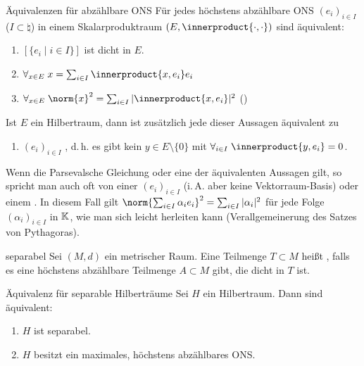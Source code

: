 \begin{Satz}{Äquivalenzen für abzählbare ONS}
    Für jedes höchstens abzählbare ONS $(e_i)_{i \in I}$ ($I \subset \natural$)
    in einem Skalarproduktraum $(E, \innerproduct{\cdot, \cdot})$ sind äquivalent:
    \begin{enumerate}
        \item
        $[\{e_i \;|\; i \in I\}]$ ist dicht in $E$.

        \item
        $\forall_{x \in E}\; x = \sum_{i \in I} \innerproduct{x, e_i} e_i$

        \item
        $\forall_{x \in E}\; \norm{x}^2 = \sum_{i \in I} |\innerproduct{x, e_i}|^2$
        ()
    \end{enumerate}
    Ist $E$ ein Hilbertraum, dann ist zusätzlich jede dieser Aussagen äquivalent zu
    \begin{enumerate}[start=4]
        \item
        $(e_i)_{i \in I}$ , d.\,h. es gibt kein $y \in E \setminus \{0\}$ mit
        $\forall_{i \in I}\; \innerproduct{y, e_i} = 0$.
    \end{enumerate}
\end{Satz}

\begin{Bem}
    Wenn die Parsevalsche Gleichung oder eine der äquivalenten Aussagen gilt,
    so spricht man auch oft von einer
     $(e_i)_{i \in I}$
    (i.\,A. aber keine Vektorraum-Basis)
    oder einem .
    In diesem Fall gilt
    $\norm{\sum_{i \in I} \alpha_i e_i}^2 = \sum_{i \in I} |\alpha_i|^2$
    für jede Folge $(\alpha_i)_{i \in I}$ in $\mathbb{K}$, wie man sich leicht herleiten kann
    (Verallgemeinerung des Satzes von Pythagoras).
\end{Bem}

\linie

\begin{Def}{separabel}
    Sei $(M, d)$ ein metrischer Raum.
    Eine Teilmenge $T \subset M$ heißt , falls es eine höchstens abzählbare
    Teilmenge $A \subset M$ gibt, die dicht in $T$ ist.
\end{Def}

\begin{Satz}{Äquivalenz für separable Hilberträume}
    Sei $H$ ein Hilbertraum. Dann sind äquivalent:
    \begin{enumerate}
        \item
        $H$ ist separabel.

        \item
        $H$ besitzt ein maximales, höchstens abzählbares ONS.
    \end{enumerate}
\end{Satz}

